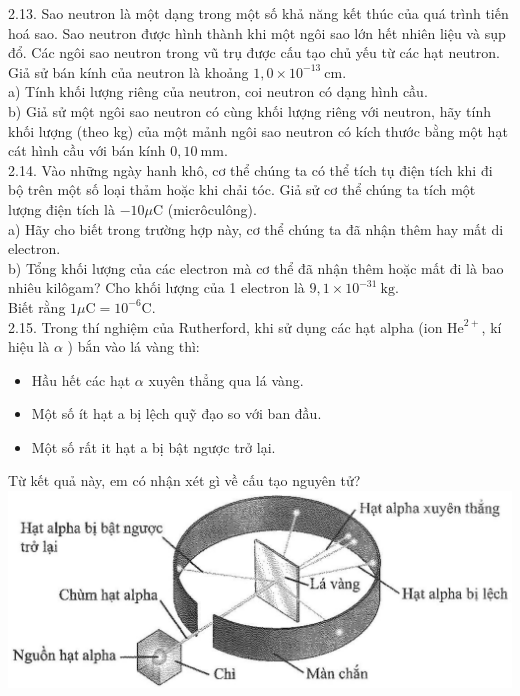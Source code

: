 \documentclass[10pt]{article}
\begin{document}
\begin{enumerate}
\begin{enumerate}
2.13. Sao neutron là một dạng trong một số khả năng kết thúc của quá trình tiến hoá sao. Sao neutron được hình thành khi một ngôi sao lớn hết nhiên liệu và sụp đổ. Các ngôi sao neutron trong vũ trụ được cấu tạo chủ yếu từ các hạt neutron. Giả sử bán kính của neutron là khoảng $1,0 \times 10^{-13} \mathrm{~cm}$.\\
a) Tính khối lượng riêng của neutron, coi neutron có dạng hình cầu.\\
b) Giả sử một ngôi sao neutron có cùng khối lượng riêng với neutron, hãy tính khối lượng (theo kg) của một mảnh ngôi sao neutron có kích thước bằng một hạt cát hình cầu với bán kính $0,10 \mathrm{~mm}$.\\
2.14. Vào những ngày hanh khô, cơ thể chúng ta có thể tích tụ điện tích khi đi bộ trên một số loại thảm hoặc khi chải tóc. Giả sử cơ thể chúng ta tích một lượng điện tích là $-10 \mu \mathrm{C}$ (micrôculông).\\
a) Hãy cho biết trong trường hợp này, cơ thể chúng ta đã nhận thêm hay mất di electron.\\
b) Tổng khối lượng của các electron mà cơ thể đã nhận thêm hoặc mất đi là bao nhiêu kilôgam? Cho khối lượng của 1 electron là $9,1 \times 10^{-31} \mathrm{~kg}$.\\
Biết rằng $1 \mu \mathrm{C}=10^{-6} \mathrm{C}$.\\
2.15. Trong thí nghiệm của Rutherford, khi sử dụng các hạt alpha (ion $\mathrm{He}^{2+}$, kí hiệu là $\alpha$ ) bắn vào lá vàng thì:
  \end{enumerate}
\end{enumerate}

\begin{itemize}
  \item Hầu hết các hạt $\alpha$ xuyên thẳng qua lá vàng.
  \item Một số ít hạt a bị lệch quỹ đạo so với ban đầu.
  \item Một số rất it hạt a bị bật ngược trở lại.
\end{itemize}

Từ kết quả này, em có nhận xét gì về cấu tạo nguyên tử?\\
\includegraphics[max width=\textwidth, center]{2025_10_23_76620c17ffac1ae9b35bg-05}
\end{document}
